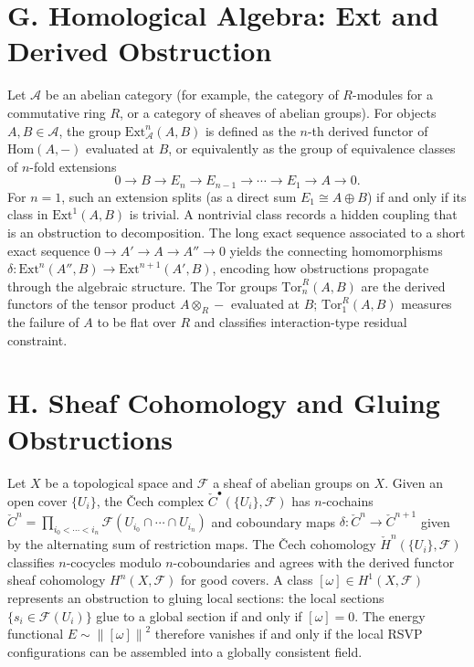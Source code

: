 \documentclass[12pt,a4paper,openany]{book}
\theoremstyle{plain}
\theoremstyle{definition}
\theoremstyle{remark}
\newcommand{\Energy}{E}
\newcommand{\norm}[1]{\left\|#1\right\|}
\begin{document}
\section*{G. Homological Algebra: Ext and Derived Obstruction}

Let $\mathcal{A}$ be an abelian category (for example, the category of $R$-modules for a commutative ring $R$, or a category of sheaves of abelian groups). For objects $A, B \in \mathcal{A}$, the group $\mathrm{Ext}^n_\mathcal{A}(A, B)$ is defined as the $n$-th derived functor of $\mathrm{Hom}(A, -)$ evaluated at $B$, or equivalently as the group of equivalence classes of $n$-fold extensions
\[
0 \to B \to E_n \to E_{n-1} \to \cdots \to E_1 \to A \to 0.
\]
For $n = 1$, such an extension splits (as a direct sum $E_1 \cong A \oplus B$) if and only if its class in $\mathrm{Ext}^1(A, B)$ is trivial. A nontrivial class records a hidden coupling that is an obstruction to decomposition. The long exact sequence associated to a short exact sequence $0 \to A' \to A \to A'' \to 0$ yields the connecting homomorphisms $\delta : \mathrm{Ext}^n(A'', B) \to \mathrm{Ext}^{n+1}(A', B)$, encoding how obstructions propagate through the algebraic structure. The Tor groups $\mathrm{Tor}_n^R(A, B)$ are the derived functors of the tensor product $A \otimes_R -$ evaluated at $B$; $\mathrm{Tor}_1^R(A, B)$ measures the failure of $A$ to be flat over $R$ and classifies interaction-type residual constraint.

\section*{H. Sheaf Cohomology and Gluing Obstructions}

Let $X$ be a topological space and $\mathcal{F}$ a sheaf of abelian groups on $X$. Given an open cover $\{U_i\}$, the \v{C}ech complex $\check{C}^\bullet(\{U_i\}, \mathcal{F})$ has $n$-cochains $\check{C}^n = \prod_{i_0 < \cdots < i_n} \mathcal{F}(U_{i_0} \cap \cdots \cap U_{i_n})$ and coboundary maps $\delta : \check{C}^n \to \check{C}^{n+1}$ given by the alternating sum of restriction maps. The \v{C}ech cohomology $\check{H}^n(\{U_i\}, \mathcal{F})$ classifies $n$-cocycles modulo $n$-coboundaries and agrees with the derived functor sheaf cohomology $H^n(X, \mathcal{F})$ for good covers. A class $[\omega] \in H^1(X, \mathcal{F})$ represents an obstruction to gluing local sections: the local sections $\{s_i \in \mathcal{F}(U_i)\}$ glue to a global section if and only if $[\omega] = 0$. The energy functional $\Energy \sim \norm{[\omega]}^2$ therefore vanishes if and only if the local RSVP configurations can be assembled into a globally consistent field.
\end{document}

